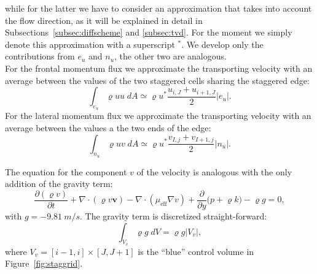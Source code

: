 \begin{itemize}
	while for the latter we have to consider an approximation that takes into 
	account the flow direction, as it will be explained in detail in 
	Subsections~\ref{subsec:diffscheme} and \ref{subsec:tvd}. For the moment we 
	simply denote this approximation with a superscript $^*$.
	We develop only the contributions from $e_u$ and $n_u$, the other two are 
	analogous.\\
	For the frontal momentum flux we approximate the transporting velocity with 
	an average between the values of the two staggered cells sharing the 
	staggered edge:
	\begin{equation}
		\int_{e_u} \varrho u u \; dA \simeq \varrho u^* \frac{u_{i,J} + 
		u_{i+1,J}}{2}|e_u|.
	\end{equation}
	For the lateral momentum flux we approximate the transporting velocity with 
	an average between the values a the two ends of the edge:
	\begin{equation}
	\int_{n_u} \varrho u v \; dA \simeq \varrho u^* \frac{v_{I,j} 
	+v_{I+1,j}}{2} |n_u|.
	\end{equation}
	
\end{itemize}

The equation for the component $v$ of the velocity is analogous with the only 
addition of the gravity term:
\begin{equation}
\frac{\partial{(\varrho v)}}{\partial t} + \nabla \cdot (\varrho v 
\mathbf{v}) - \nabla \cdot (\mu_\text{eff} \nabla v) + 
\frac{\partial}{\partial y} \big(p + \varrho k\big) - \varrho g= 0,
\end{equation}
with $g = \SI{-9.81}{m/s}$. The gravity term is discretized straight-forward:
\begin{equation}
\int_{V_v} \varrho g \; dV = \varrho g |V_v|,
\end{equation}
where $V_v = [i-1, i] \times [J, J+1]$ is the ``blue'' control volume in 
Figure~\ref{fig:staggrid}. 

%
